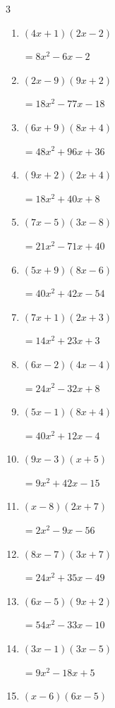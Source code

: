 \begin{multicols}{3}
\begin{enumerate}
        $=9x^{2}-21x+6$

\columnbreak %

\resetques

  \item $(4x+1)(2x-2)$

        $=8x^{2}-6x-2$

  \item $(2x-9)(9x+2)$

        $=18x^{2}-77x-18$

  \item $(6x+9)(8x+4)$

        $=48x^{2}+96x+36$

  \item $(9x+2)(2x+4)$

        $=18x^{2}+40x+8$

  \item $(7x-5)(3x-8)$

        $=21x^{2}-71x+40$

  \item $(5x+9)(8x-6)$

        $=40x^{2}+42x-54$

  \item $(7x+1)(2x+3)$

        $=14x^{2}+23x+3$

  \item $(6x-2)(4x-4)$

        $=24x^{2}-32x+8$

  \item $(5x-1)(8x+4)$

        $=40x^{2}+12x-4$

  \item $(9x-3)(x+5)$

        $=9x^{2}+42x-15$

  \item $(x-8)(2x+7)$

        $=2x^{2}-9x-56$

  \item $(8x-7)(3x+7)$

        $=24x^{2}+35x-49$

  \item $(6x-5)(9x+2)$

        $=54x^{2}-33x-10$

  \item $(3x-1)(3x-5)$

        $=9x^{2}-18x+5$

  \item $(x-6)(6x-5)$


\end{enumerate}
\end{multicols}
